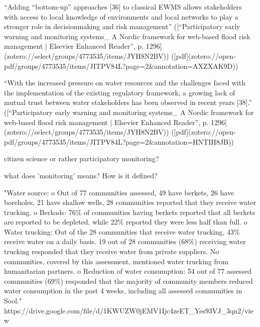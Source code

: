 “Adding “bottom-up” approaches [36] to classical EWMS allows stakeholders with access to local knowledge of environments and local networks to play a stronger role in decisionmaking and risk management” ([“Participatory early warning and monitoring systems_ A Nordic framework for web-based flood risk management | Elsevier Enhanced Reader”, p. 1296](zotero://select/groups/4773535/items/JYH8N2BV)) ([pdf](zotero://open-pdf/groups/4773535/items/JITPV84L?page=2&annotation=AXZXAK9D))

“With the increased pressure on water resources and the challenges faced with the implementation of the existing regulatory framework, a growing lack of mutual trust between water stakeholders has been observed in recent years [38].” ([“Participatory early warning and monitoring systems_ A Nordic framework for web-based flood risk management | Elsevier Enhanced Reader”, p. 1296](zotero://select/groups/4773535/items/JYH8N2BV)) ([pdf](zotero://open-pdf/groups/4773535/items/JITPV84L?page=2&annotation=HNTIH8JB))

citizen science or rather participatory monitoring?


what does 'monitoring' means? How is it defined?

"Water source:
o Out of 77 communities assessed, 49 have berkets, 26 have boreholes, 21 have shallow
wells, 28 communities reported that they receive water trucking.
o Berkads: 76\% of communities having berkets reported that all berkets are reported to be
depleted, while 22\% reported they were less half than full.
o Water trucking: Out of the 28 communities that receive water trucking, 43\% receive water
on a daily basis. 19 out of 28 communities (68\%) receiving water trucking responded that
they receive water from private suppliers. No communities, covered by this assessment,
mentioned water trucking from humanitarian partners.
o Reduction of water consumption: 54 out of 77 assessed communities (69\%) responded
that the majority of community members reduced water consumption in the past 4 weeks,
including all assessed communities in Sool." https://drive.google.com/file/d/1KWUZW0jEMV1Ijc4zeET_Yes93VJ_3qn2/view


